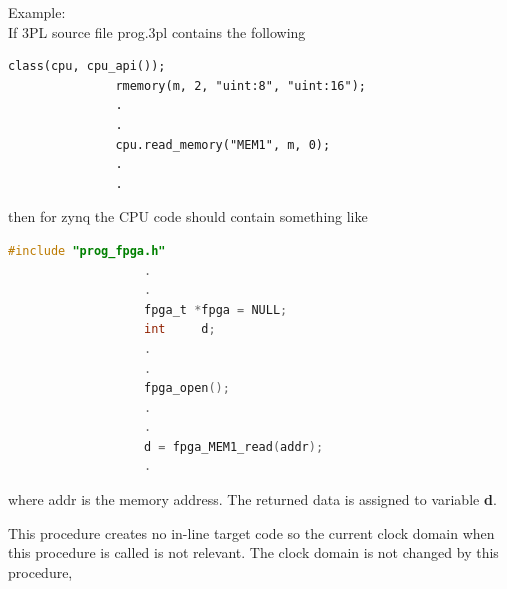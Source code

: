             Example: \\
            If 3PL source file prog.3pl contains the following \\
            \begin{lstlisting}[gobble=12, language=threepl]
               class(cpu, cpu_api());
               rmemory(m, 2, "uint:8", "uint:16");
               .
               .
               cpu.read_memory("MEM1", m, 0);
               .
               .
            \end{lstlisting}
            then for zynq the CPU code should contain something like \\
            \begin{lstlisting}[gobble=12, language=C]
                   #include "prog_fpga.h"
                   .
                   .
                   fpga_t *fpga = NULL;
                   int     d;
                   .
                   .
                   fpga_open();
                   .
                   .
                   d = fpga_MEM1_read(addr);
                   .
            \end{lstlisting}
            where addr is the memory address. The returned data is assigned
            to variable {\bf d}.

            This procedure creates no in-line target code so the current clock domain
            when this procedure is called is not relevant. The clock domain is not
            changed by this procedure,
